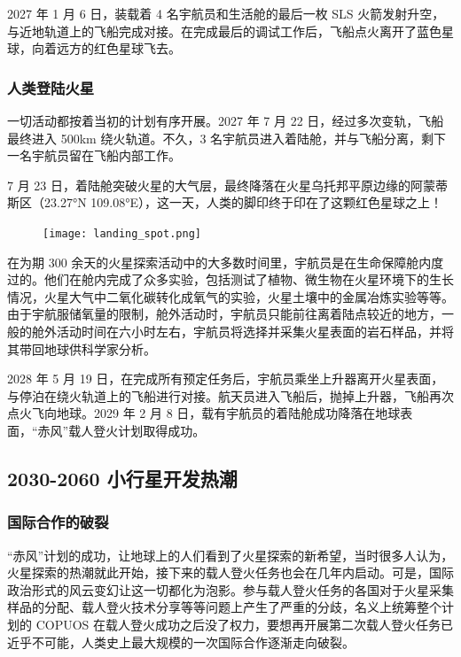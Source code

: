 \documentclass[letterpaper,10pt]{sphinxmanual}
\begin{document}
2027 年 1 月 6 日，装载着 4 名宇航员和生活舱的最后一枚 SLS 火箭发射升空，与近地轨道上的飞船完成对接。在完成最后的调试工作后，飞船点火离开了蓝色星球，向着远方的红色星球飞去。
\begin{figure}[htbp]
\centering
\end{figure}


\subsubsection{人类登陆火星}
\label{history:id5}
一切活动都按着当初的计划有序开展。2027 年 7 月 22 日，经过多次变轨，飞船最终进入 500km 绕火轨道。不久，3 名宇航员进入着陆舱，并与飞船分离，剩下一名宇航员留在飞船内部工作。

7 月 23 日，着陆舱突破火星的大气层，最终降落在火星乌托邦平原边缘的阿蒙蒂斯区（23.27°N 109.08°E），这一天，人类的脚印终于印在了这颗红色星球之上！
\begin{figure}[htbp]
\centering

\texttt{[image: landing\_spot.png]}
\end{figure}

在为期 300 余天的火星探索活动中的大多数时间里，宇航员是在生命保障舱内度过的。他们在舱内完成了众多实验，包括测试了植物、微生物在火星环境下的生长情况，火星大气中二氧化碳转化成氧气的实验，火星土壤中的金属冶炼实验等等。由于宇航服储氧量的限制，舱外活动时，宇航员只能前往离着陆点较近的地方，一般的舱外活动时间在六小时左右，宇航员将选择并采集火星表面的岩石样品，并将其带回地球供科学家分析。

2028 年 5 月 19 日，在完成所有预定任务后，宇航员乘坐上升器离开火星表面，与停泊在绕火轨道上的飞船进行对接。航天员进入飞船后，抛掉上升器，飞船再次点火飞向地球。2029 年 2 月 8 日，载有宇航员的着陆舱成功降落在地球表面，“赤风”载人登火计划取得成功。


\subsection{2030-2060 小行星开发热潮}
\label{history:id6}

\subsubsection{国际合作的破裂}
\label{history:id7}
“赤风”计划的成功，让地球上的人们看到了火星探索的新希望，当时很多人认为，火星探索的热潮就此开始，接下来的载人登火任务也会在几年内启动。可是，国际政治形式的风云变幻让这一切都化为泡影。参与载人登火任务的各国对于火星采集样品的分配、载人登火技术分享等等问题上产生了严重的分歧，名义上统筹整个计划的 COPUOS 在载人登火成功之后没了权力，要想再开展第二次载人登火任务已近乎不可能，人类史上最大规模的一次国际合作逐渐走向破裂。
\end{document}
